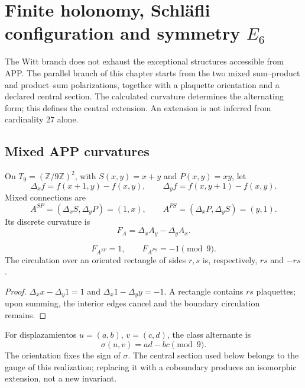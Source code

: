 \section{Finite holonomy, Schläfli configuration and symmetry \texorpdfstring{\(E_6\)}{E6}}
\label{x_reciprocidad:p12-83-c20-s6:chap:holonomia-schlafli-e6-nuevo}

The Witt branch does not exhaust the exceptional structures accessible from
APP. The parallel branch of this chapter starts from the two mixed
sum--product and product--sum polarizations, together with a plaquette
orientation and a declared central section. The calculated curvature determines
the alternating form; this defines the central extension. An
extension is not inferred from cardinality 27 alone.

\subsection{Mixed APP curvatures}

On \(T_9=(\mathbb Z/9\mathbb Z)^2\), with
\(S(x,y)=x+y\) and \(P(x,y)=xy\), let
\[
 \Delta_xf=f(x+1,y)-f(x,y),\qquad
 \Delta_yf=f(x,y+1)-f(x,y).
\]
Mixed connections are
\[
 A^{SP}=(\Delta_xS,\Delta_yP)=(1,x),\qquad
 A^{PS}=(\Delta_xP,\Delta_yS)=(y,1).
\]
Its discrete curvature is
\[
 F_A=\Delta_xA_y-\Delta_yA_x.
\]

\begin{proposition}
\label{x_reciprocidad:p12-83-c20-s6:prop:curvaturas-app-e6-nuevo}
\[
 F_{A^{SP}}=1,\qquad F_{A^{PS}}=-1\pmod9.
\]
The circulation over an oriented rectangle of sides \(r,s\) is,
respectively, \(rs\) and \(-rs\).
\end{proposition}

\begin{proof}
\(\Delta_xx-\Delta_y1=1\) and
\(\Delta_x1-\Delta_yy=-1\). A rectangle contains \(rs\) plaquettes; upon
summing, the interior edges cancel and the boundary circulation remains.
\end{proof}

For displazamientos \(u=(a,b)\), \(v=(c,d)\), the class alternante is
\begin{equation}
 \sigma(u,v)=ad-bc\pmod9.
 \label{x_reciprocidad:p12-83-c20-s6:eq:forma-alternante-e6-nueva}
\end{equation}
The orientation fixes the sign of \(\sigma\). The central section used
below belongs to the gauge of this realization; replacing it with a coboundary
produces an isomorphic extension, not a new invariant.

